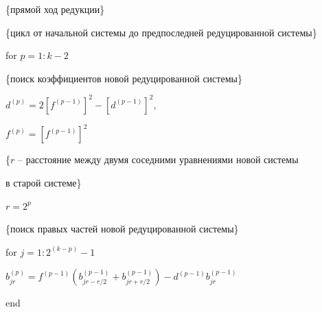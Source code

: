 {\tt \footnotesize



\{прямой ход редукции\}



\{цикл от начальной системы до предпоследней редуцированной системы\}



for $p=1:k-2$



\hspace{.5cm}

\{поиск коэффициентов новой редуцированной системы\} 



\hspace{.5cm}

$d^{(p)}=2[f^{(p-1)}]^2-[d^{(p-1)}]^2 $, 



\hspace{.5cm}

$f^{(p)}=[f^{(p-1)}]^2$



\hspace{.5cm}

\{$r$ -- расстояние между двумя соседними уравнениями новой системы



\hspace{.5cm} в старой системе\} 



\hspace{.5cm}

$r=2^p$



\hspace{.5cm}

\{поиск правых частей новой редуцированной системы\}





\hspace{.5cm}\hspace{.5cm} for $j=1:2^{(k-p)}-1$



\hspace{.5cm}\hspace{.5cm}\hspace{.5cm}

$b_{jr}^{(p)}=f^{(p-1)}(b_{jr-r/2}^{(p-1)}+b_{jr+r/2}^{(p-1)})-d^{(p-1)}b_{jr}^{(p-1)}$



\hspace{.5cm}\hspace{.5cm}end



}
